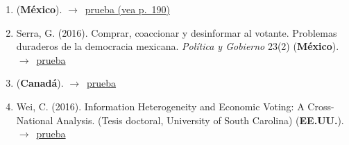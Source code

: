 \documentclass[12 pt, letter]{article}
\newenvironment{CitasMiTrabajo}{
    \begin{footnotesize}
    \begin{enumerate}[label={\footnotesize\emph{cita~\arabic*}},ref=\arabic*] %
        \setlength{\itemsep}{.1\itemsep}
        \setlength{\parskip}{.1\parskip}
    }{\end{enumerate}\end{footnotesize}}
\begin{document}
        \begin{CitasMiTrabajo}
        \item {} (\textbf{M\'exico}). $\rightarrow$~\href{http://www.politicaygobierno.cide.edu/index.php/pyg/article/view/1297/988}{prueba (vea p.\ 190)}

        \item Serra, G. (2016). Comprar, coaccionar y desinformar al votante. Problemas duraderos de la democracia mexicana. \emph{Pol\'itica y Gobierno} 23(2) (\textbf{M\'exico}). $\rightarrow$~\href{http://www.scielo.org.mx/scielo.php?pid=S1665-20372016000200409&script=sci_arttext&tlng=en}{prueba}          

        \item {} (\textbf{Canad\'a}). $\rightarrow$~\href{http://www.ieim.uqam.ca/IMG/pdf/chroniques_des_ameriques_-_nafta.pdf}{prueba}

        \item Wei, C. (2016). Information Heterogeneity and Economic Voting: A Cross-National Analysis. (Tesis doctoral, University of South Carolina) (\textbf{EE.UU.}). $\rightarrow$~\href{https://scholarcommons.sc.edu/etd/3847}{prueba}          

        \label{ncites:magar.2007ref.2015} %

        \end{CitasMiTrabajo}


        
\end{document}
